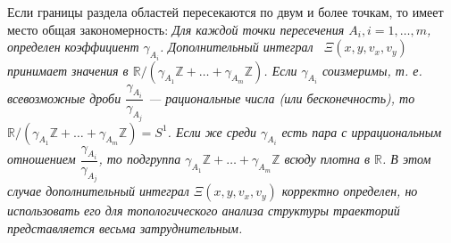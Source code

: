 Если границы раздела областей пересекаются по двум и более точкам, то имеет место общая закономерность: 
\textit{ 
\noindent Для каждой точки пересечения $A_i, i=1,\ldots,m$, определен коэффициент $\gamma_{A_i}$. Дополнительный интеграл \  $\Xi(x, y, v_x, v_y)$ принимает значения в $\mathbb{R}/(\gamma_{A_1} \mathbb{Z}+ \ldots + \gamma_{A_m} \mathbb{Z})$. Если $\gamma_{A_i}$ соизмеримы, т. е. всевозможные дроби $\dfrac{\gamma_{A_i}}{\gamma_{A_j}}$ --- рациональные числа (или бесконечность), то $\mathbb{R}/(\gamma_{A_1} \mathbb{Z}+ \ldots + \gamma_{A_m} \mathbb{Z}) = S^1$. Если же среди $\gamma_{A_i}$ есть пара с иррациональным отношением $\dfrac{\gamma_{A_i}}{\gamma_{A_j}}$, то подгруппа $\gamma_{A_1} \mathbb{Z}+ \ldots + \gamma_{A_m} \mathbb{Z}$ всюду плотна в $\mathbb{R}$. В этом случае дополнительный интеграл $\Xi(x, y, v_x, v_y)$ корректно определен, но использовать его для топологического анализа структуры траекторий представляется весьма затруднительным.}

%
%
%


